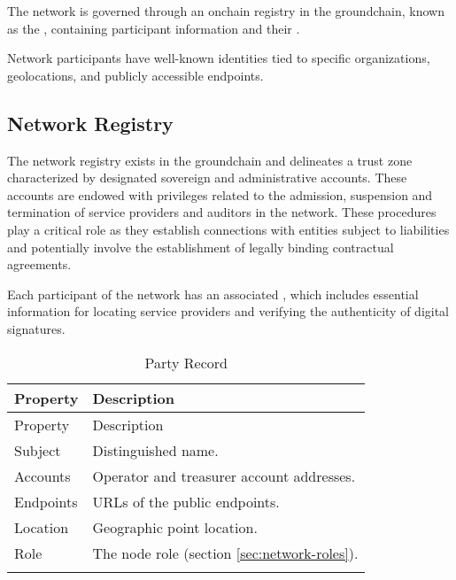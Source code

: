 \documentclass{oc}
\begin{document}
The network is governed through an onchain registry in the \gls{groundchain}, known as the , containing participant information and their .

Network participants have well-known identities tied to specific organizations, geolocations, and publicly accessible endpoints.

\subsection{Network Registry}\label{sec:network-registry}

The network registry exists in the \gls{groundchain} and delineates a trust zone characterized by designated sovereign and administrative accounts.
These accounts are endowed with privileges related to the admission, suspension and termination of service providers and auditors in the network.
These procedures play a critical role as they establish connections with entities subject to liabilities and potentially involve the establishment of legally binding contractual agreements.

Each participant of the network has an associated , which includes essential information for locating service providers and verifying the authenticity of digital signatures.

\begin{xltabular}{\linewidth}{ l  X }
  \caption{Party Record} 
  \label{table:party-record}\\
  \toprule
   Property & Description  \\
  \midrule
  \endfirsthead
   Property & Description  \\
  \midrule
  \endhead
  \bottomrule
  \endfoot
  
  Subject &  Distinguished name\cite{x510}. \\ \addlinespace

  Accounts & Operator and treasurer account addresses. \\ \addlinespace
    
  Endpoints & URLs\cite{rfc3986} of the public endpoints. \\  \addlinespace
  
  Location & Geographic point location\cite{iso6709}. \\  \addlinespace
    
  Role & The node role (section \ref{sec:network-roles}). \\ \addlinespace
  
\end{xltabular}
\end{document}
